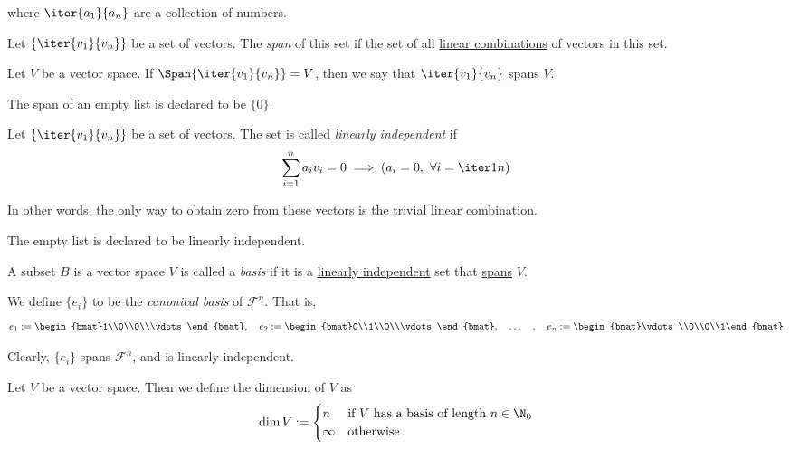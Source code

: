 where $\iter{a_1}{a_n}$ are a collection of numbers.

\label{ac574be}

Let $\{\iter{v_1}{v_n}\}$ be a set of vectors. The \textit{span} of this set if
the set of all \href{ceb6342}{linear combinations} of vectors in this set.

Let $V$ be a vector space. If $\Span\{\iter{v_1}{v_n}\}=V$, then we say that
$\iter{v_1}{v_n}$ spans $V$.

The span of an empty list is declared to be $\{0\}$.

\label{c133a44}

Let $\{\iter{v_1}{v_n}\}$ be a set of vectors. The set is called
\textit{linearly independent} if
$$
  \sum_{i=1}^na_iv_i=0\implies(a_i=0,\ \forall i=\iter1n)
$$

In other words, the only way to obtain zero from these vectors is the trivial
linear combination.

The empty list is declared to be linearly independent.

\label{db2477b}

A subset $B$ is a vector space $V$ is called a \textit{basis} if it is a
\href{c133a44}{linearly independent} set that \href{ac574be}{spans} $V$.

\label{c01037d}

We define $\{e_i\}$ to be the \textit{canonical basis} of $\mathcal F^n$. That
is,
$$
  e_1:=\begin{bmat}1\\0\\0\\\vdots\end{bmat},\quad
  e_2:=\begin{bmat}0\\1\\0\\\vdots\end{bmat},\quad\ldots\quad,\quad
  e_n:=\begin{bmat}\vdots\\0\\0\\1\end{bmat}
$$

Clearly, $\{e_i\}$ spans $\mathcal F^n$, and is linearly independent.

\label{cd4284b}

Let $V$ be a vector space. Then we define the dimension of $V$ as
$$
  \dim V:=\begin{cases}
    n      & \text{if $V$ has a basis of length $n\in\N_0$} \\
    \infty & \text{otherwise}
  \end{cases}
$$

